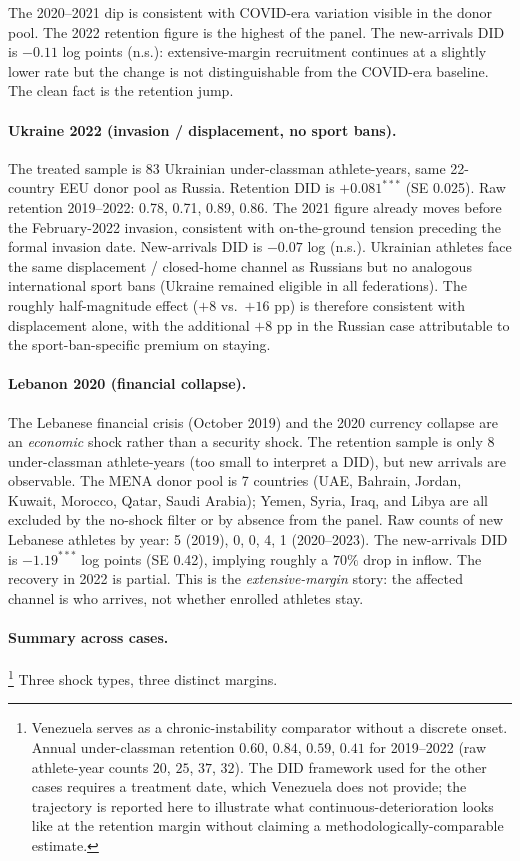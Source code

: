 \documentclass[11pt]{article}
\begin{document}
\noindent The 2020--2021 dip is consistent with COVID-era variation
visible in the donor pool. The 2022 retention figure is the highest
of the panel. The new-arrivals DID is $-0.11$ log points (n.s.):
extensive-margin recruitment continues at a slightly lower rate but
the change is not distinguishable from the COVID-era baseline. The
clean fact is the retention jump.

\paragraph{Ukraine 2022 (invasion / displacement, no sport bans).}
The treated sample is 83 Ukrainian under-classman athlete-years,
same 22-country EEU donor pool as Russia. Retention DID is
$\mathbf{+0.081^{***}}$ (SE 0.025). Raw retention 2019--2022:
0.78, 0.71, 0.89, 0.86. The 2021 figure already moves before the
February-2022 invasion, consistent with on-the-ground tension
preceding the formal invasion date. New-arrivals DID is $-0.07$ log
(n.s.). Ukrainian athletes face the same displacement / closed-home
channel as Russians but no analogous international sport bans
(Ukraine remained eligible in all federations). The roughly
half-magnitude effect ($+8$ vs.\ $+16$ pp) is therefore consistent
with displacement alone, with the additional $+8$ pp in the Russian
case attributable to the sport-ban-specific premium on staying.

\paragraph{Lebanon 2020 (financial collapse).}
The Lebanese financial crisis (October 2019) and the 2020 currency
collapse are an \emph{economic} shock rather than a security shock.
The retention sample is only 8 under-classman athlete-years (too
small to interpret a DID), but new arrivals are observable. The
MENA donor pool is 7 countries (UAE, Bahrain, Jordan, Kuwait,
Morocco, Qatar, Saudi Arabia); Yemen, Syria, Iraq, and Libya are
all excluded by the no-shock filter or by absence from the panel.
Raw counts of new Lebanese athletes by year: 5 (2019), 0, 0, 4, 1
(2020--2023). The new-arrivals DID is $\mathbf{-1.19^{***}}$ log
points (SE 0.42), implying roughly a $70\%$ drop in inflow. The
recovery in 2022 is partial. This is the \emph{extensive-margin}
story: the affected channel is who arrives, not whether enrolled
athletes stay.

\paragraph{Summary across cases.}\footnote{Venezuela serves as a
chronic-instability comparator without a discrete onset. Annual
under-classman retention $0.60$, $0.84$, $0.59$, $0.41$ for
2019--2022 (raw athlete-year counts $20$, $25$, $37$, $32$).
The DID framework used for the other cases requires a treatment
date, which Venezuela does not provide; the trajectory is reported
here to illustrate what continuous-deterioration looks like at the
retention margin without claiming a methodologically-comparable
estimate.} Three shock types, three distinct margins.
\end{document}
